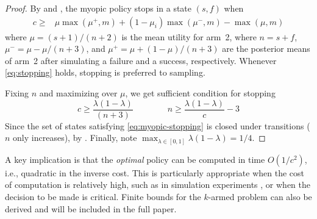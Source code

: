 \begin{hiddenproof}
	\begin{proof}
		By  and , the myopic policy stops in
		a state $(s,f)$ when
		\begin{align}
			c \ge &\mu\max(\mu^+,m) + (1-\mu_i)\max(\mu^-, m) - \max(\mu,m) \label{eq:stopping}
		\end{align}
		where $\mu=(s+1)/(n+2)$  is the mean utility for arm~2, where $n=s+f$,
		$\mu^- = \mu - \mu/(n+3)$, and $\mu^+ = \mu + (1-\mu)/(n+3)$
		are the posterior means of arm~2 after simulating a failure and a success,
		respectively.  Whenever \eqref{eq:stopping} holds, stopping is preferred to sampling.

		Fixing $n$ and maximizing over $\mu$, we get sufficient condition for stopping
		\begin{equation}
			c \ge \frac{\lambda(1-\lambda)}{(n+3)} \qquad\qquad   n\ge \frac{\lambda(1-\lambda)}{c} - 3  \label{eq:myopic-stopping}
		\end{equation}
		Since the set of states satisfying \eqref{eq:myopic-stopping} is closed under
		transitions ($n$ only increases), by .  Finally, note $\max_{\lambda\in[0,1]} \lambda(1-\lambda)=1/4$.
	\end{proof}	
\end{hiddenproof}

A key implication is that the \emph{optimal} policy can be computed
in time $O(1/c^2)$, i.e., quadratic in the inverse cost.  This is particularly appropriate when the cost of 
computation is relatively high, such as in simulation experiments \citep{Swisher+et+al:2003},
or when the decision to be made is critical. Finite bounds for the $k$-armed problem
can also be derived and will be included in the full paper.
